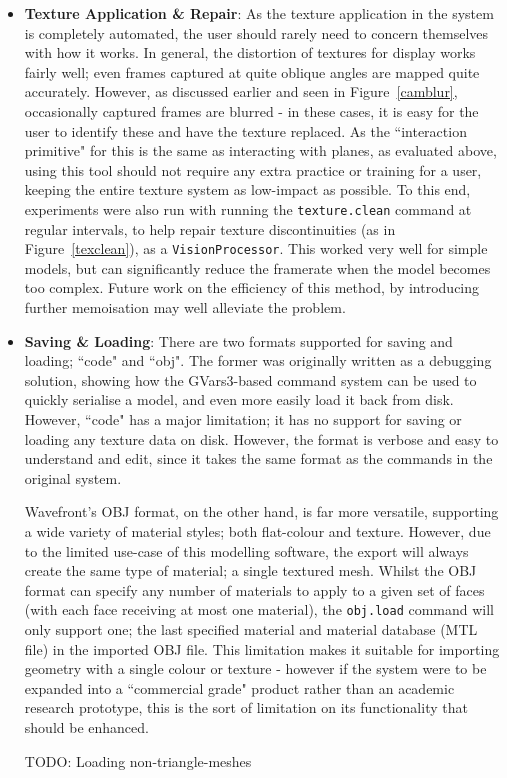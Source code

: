 \documentclass[a4paper,10pt]{article}
\begin{document}
\begin{itemize}
\item{\textbf{Texture Application \& Repair}: As the texture application in the system is completely automated, the user should rarely need to concern themselves with how it works. In general, the distortion of textures for display works fairly well; even frames captured at quite oblique angles are mapped quite accurately. However, as discussed earlier and seen in Figure~\ref{camblur}, occasionally captured frames are blurred - in these cases, it is easy for the user to identify these and have the texture replaced. As the ``interaction primitive" for this is the same as interacting with planes, as evaluated above, using this tool should not require any extra practice or training for a user, keeping the entire texture system as low-impact as possible. To this end, experiments were also run with running the \texttt{texture.clean} command at regular intervals, to help repair texture discontinuities (as in Figure~\ref{texclean}), as a \texttt{VisionProcessor}. This worked very well for simple models, but can significantly reduce the framerate when the model becomes too complex. Future work on the efficiency of this method, by introducing further memoisation may well alleviate the problem.
}

\item{\textbf{Saving \& Loading}: There are two formats supported for saving and loading; ``code" and ``obj". The former was originally written as a debugging solution, showing how the GVars3-based command system can be used to quickly serialise a model, and even more easily load it back from disk. However, ``code" has a major limitation; it has no support for saving or loading any texture data on disk. However, the format is verbose and easy to understand and edit, since it takes the same format as the commands in the original system.

Wavefront's OBJ format, on the other hand, is far more versatile, supporting a wide variety of material styles; both flat-colour and texture. However, due to the limited use-case of this modelling software, the export will always create the same type of material; a single textured mesh. Whilst the OBJ format can specify any number of materials to apply to a given set of faces (with each face receiving at most one material), the \texttt{obj.load} command will only support one; the last specified material and material database (MTL file) in the imported OBJ file. This limitation makes it suitable for importing geometry with a single colour or texture - however if the system were to be expanded into a ``commercial grade" product rather than an academic research prototype, this is the sort of limitation on its functionality that should be enhanced.

TODO: Loading non-triangle-meshes
 }
\end{itemize}
\end{document}
